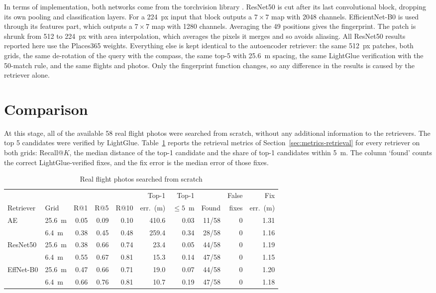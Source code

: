 \documentclass[english, Lau, oneside]{sapthesis}%
\begin{document}
In terms of implementation, both networks come from the torchvision library \citep{torchvision2016}. ResNet50 is cut after its last convolutional block, dropping its own pooling and classification layers. For a 224~px input that block outputs a $7 \times 7$ map with 2048 channels. EfficientNet-B0 is used through its features part, which outputs a $7 \times 7$ map with 1280 channels. Averaging the 49 positions gives the fingerprint. The patch is shrunk from 512 to 224~px with area interpolation, which averages the pixels it merges and so avoids aliasing. All ResNet50 results reported here use the Places365 weights. Everything else is kept identical to the autoencoder retriever: the same 512~px patches, both grids, the same de-rotation of the query with the compass, the same top-5 with 25.6~m spacing, the same LightGlue verification with the 50-match rule, and the same flights and photos. Only the fingerprint function changes, so any difference in the results is caused by the retriever alone.

\section{Comparison}
\label{sec:reloc-comparison}
At this stage, all of the available 58 real flight photos were searched from scratch, without any additional information to the retrievers. The top 5 candidates were verified by LightGlue. Table~\ref{tab:retrieval-real} reports the retrieval metrics of Section~\ref{sec:metrics-retrieval} for every retriever on both grids: Recall@$K$, the median distance of the top-1 candidate and the share of top-1 candidates within 5~m. The column `found' counts the correct LightGlue-verified fixes, and the fix error is the median error of those fixes.

\begin{table}[!htbp]
  \centering
  \caption{Real flight photos searched from scratch}
  \label{tab:retrieval-real}
  \footnotesize\setlength{\tabcolsep}{3.5pt}
  \begin{tabular}{llrrrrrrrr}
    \toprule
    & & & & & Top-1 & Top-1 & & False & Fix \\
    Retriever & Grid & R@1 & R@5 & R@10 & err.\ (m) & ${\le}5$~m & Found & fixes & err.\ (m) \\
    \midrule
    AE & 25.6~m & 0.05 & 0.09 & 0.10 & 410.6 & 0.03 & 11/58 & 0 & 1.31 \\
     & 6.4~m & 0.38 & 0.45 & 0.48 & 259.4 & 0.34 & 28/58 & 0 & 1.16 \\
    \addlinespace
    ResNet50 & 25.6~m & 0.38 & 0.66 & 0.74 & 23.4 & 0.05 & 44/58 & 0 & 1.19 \\
     & 6.4~m & 0.55 & 0.67 & 0.81 & 15.3 & 0.14 & 47/58 & 0 & 1.15 \\
    \addlinespace
    EffNet-B0 & 25.6~m & 0.47 & 0.66 & 0.71 & 19.0 & 0.07 & 44/58 & 0 & 1.20 \\
     & 6.4~m & 0.66 & 0.76 & 0.81 & 10.7 & 0.19 & 47/58 & 0 & 1.18 \\
    \bottomrule
  \end{tabular}
\end{table}
\end{document}
